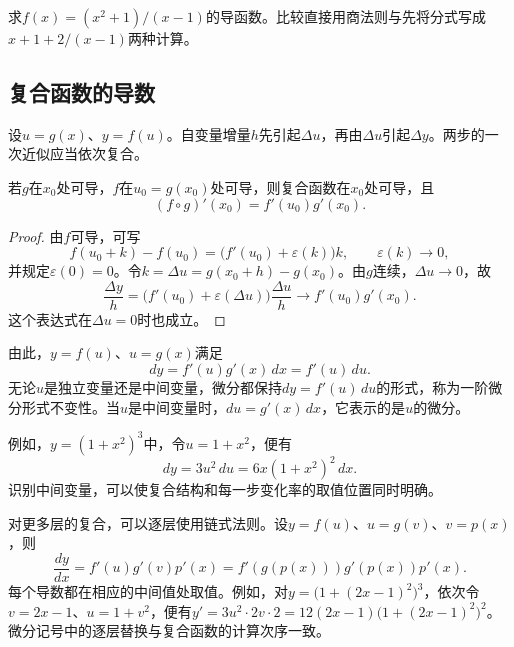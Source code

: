 \begin{example}
求\(f(x)=(x^2+1)/(x-1)\)的导函数。比较直接用商法则与先将分式写成\(x+1+2/(x-1)\)两种计算。
\end{example}

\newpage
\subsection{复合函数的导数}
\label{subsec:calculus-chain-rule}

设\(u=g(x)\)、\(y=f(u)\)。自变量增量\(h\)先引起\(\Delta u\)，再由\(\Delta u\)引起\(\Delta y\)。两步的一次近似应当依次复合。

\begin{theorem}[链式法则]\label{thm:calculus-chain-rule}
若\(g\)在\(x_0\)处可导，\(f\)在\(u_0=g(x_0)\)处可导，则复合函数在\(x_0\)处可导，且
\begin{equation*}
 (f\circ g)'(x_0)=f'(u_0)g'(x_0).
\end{equation*}
\end{theorem}

\begin{proof}
由\(f\)可导，可写
\begin{equation*}
 f(u_0+k)-f(u_0)=\bigl(f'(u_0)+\varepsilon(k)\bigr)k,
 \qquad\varepsilon(k)\to0,
\end{equation*}
并规定\(\varepsilon(0)=0\)。令\(k=\Delta u=g(x_0+h)-g(x_0)\)。由\(g\)连续，\(\Delta u\to0\)，故
\begin{equation*}
 \frac{\Delta y}h=\bigl(f'(u_0)+\varepsilon(\Delta u)\bigr)\frac{\Delta u}h
 \longrightarrow f'(u_0)g'(x_0).
\end{equation*}
这个表达式在\(\Delta u=0\)时也成立。
\end{proof}

由此，\(y=f(u)\)、\(u=g(x)\)满足
\begin{equation}\label{eq:calculus-differential-invariance}
 dy=f'(u)g'(x)\,dx=f'(u)\,du.
\end{equation}
无论\(u\)是独立变量还是中间变量，微分都保持\(dy=f'(u)\,du\)的形式，称为{\heiti{}一阶微分形式不变性}。当\(u\)是中间变量时，\(du=g'(x)\,dx\)，它表示的是\(u\)的微分。

例如，\(y=(1+x^2)^3\)中，令\(u=1+x^2\)，便有
\begin{equation*}
 dy=3u^2\,du=6x(1+x^2)^2\,dx.
\end{equation*}
识别中间变量，可以使复合结构和每一步变化率的取值位置同时明确。

对更多层的复合，可以逐层使用链式法则。设\(y=f(u)\)、\(u=g(v)\)、\(v=p(x)\)，则
\begin{equation*}
 \frac{dy}{dx}=f'(u)g'(v)p'(x)
 =f'(g(p(x)))g'(p(x))p'(x).
\end{equation*}
每个导数都在相应的中间值处取值。例如，对\(y=\bigl(1+(2x-1)^2\bigr)^3\)，依次令\(v=2x-1\)、\(u=1+v^2\)，便有\(y'=3u^2\cdot2v\cdot2=12(2x-1)\bigl(1+(2x-1)^2\bigr)^2\)。微分记号中的逐层替换与复合函数的计算次序一致。

